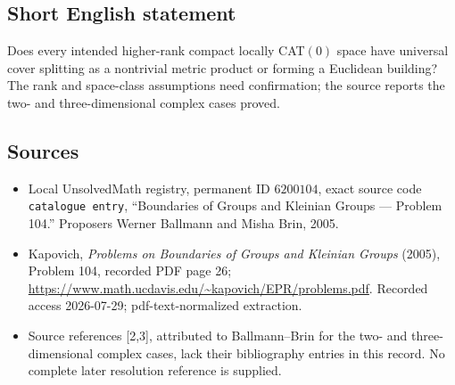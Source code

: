 \documentclass[11pt]{article}
\begin{document}
\subsection{Short English statement}
Does every intended higher-rank compact locally CAT\((0)\) space have universal cover splitting as a nontrivial metric product or forming a Euclidean building? The rank and space-class assumptions need confirmation; the source reports the two- and three-dimensional complex cases proved.
\subsection{Sources}
\begin{itemize}
\item Local UnsolvedMath registry, permanent ID \(6200104\), exact source code \texttt{catalogue entry}, ``Boundaries of Groups and Kleinian Groups --- Problem 104.'' Proposers Werner Ballmann and Misha Brin, 2005.
\item Kapovich, \emph{Problems on Boundaries of Groups and Kleinian Groups} (2005), Problem 104, recorded PDF page 26; \url{https://www.math.ucdavis.edu/~kapovich/EPR/problems.pdf}. Recorded access 2026-07-29; pdf-text-normalized extraction.
\item Source references [2,3], attributed to Ballmann--Brin for the two- and three-dimensional complex cases, lack their bibliography entries in this record. No complete later resolution reference is supplied.
\end{itemize}
\end{document}
